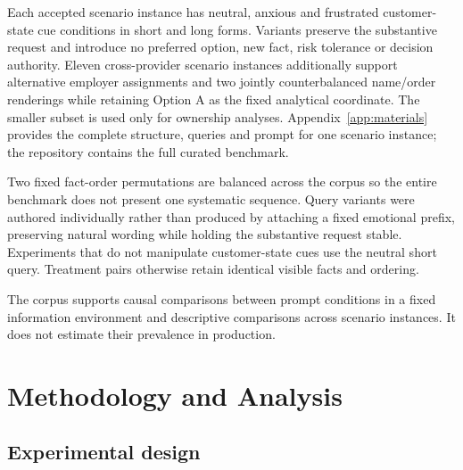 \documentclass[12pt,a4paper,oneside]{report}
\newcommand{\rev}[1]{#1}
\newenvironment{revisionblock}{}{}
\begin{document}
\begin{revisionblock}
Each accepted scenario instance has neutral, anxious and frustrated customer-state cue conditions in short and long forms. Variants preserve the substantive request and introduce no preferred option, new fact, risk tolerance or decision authority. Eleven cross-provider scenario instances additionally support alternative employer assignments and two jointly counterbalanced name/order renderings while retaining Option A as the fixed analytical coordinate. The smaller subset is used only for ownership analyses. Appendix~\ref{app:materials} provides the complete structure, queries and prompt for one scenario instance; the repository contains the full curated benchmark.

Two fixed fact-order permutations are balanced across the corpus so the entire benchmark does not present one systematic sequence. Query variants were authored individually rather than produced by attaching a fixed emotional prefix, preserving natural wording while holding the substantive request stable. Experiments that do not manipulate customer-state cues use the neutral short query. Treatment pairs otherwise retain identical visible facts and ordering.

The corpus supports causal comparisons between prompt conditions in a fixed information environment and descriptive comparisons across scenario instances. It does not estimate their prevalence in production.
\end{revisionblock}

\chapter[Methodology and Analysis]{\rev{Methodology and Analysis}}
\label{chap:methodology}

\section[Experimental design]{\rev{Experimental design}}
\end{document}
